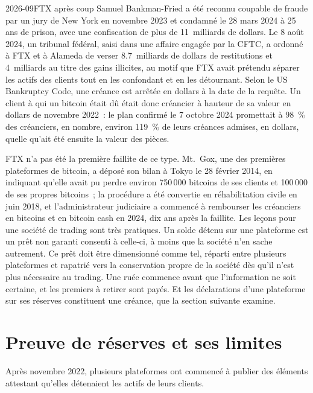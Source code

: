 \begin{dated}{2026-09}{FTX après coup}\label{dat:m3:centralised-exchanges:ftx}
Samuel Bankman-Fried a été reconnu coupable de fraude par un jury de New York en novembre 2023 et condamné le 28
mars 2024 à 25 ans de prison, avec une confiscation de plus de 11~milliards de dollars. Le 8 août 2024, un tribunal fédéral,
saisi dans une affaire engagée par la CFTC, a ordonné à FTX et à Alameda de
verser 8.7~milliards de dollars de restitutions et 4~milliards au titre des gains illicites, au motif que FTX avait
prétendu séparer les actifs des clients tout en les confondant et en les détournant. Selon le US Bankruptcy Code, une créance
est arrêtée en dollars à la date de la requête. Un client à qui un bitcoin était dû était donc créancier à hauteur de sa valeur en dollars de novembre
2022~: le plan confirmé le 7 octobre 2024 promettait à 98~\% des créanciers, en nombre, environ 119~\% de
leurs créances admises, en dollars, quelle qu'ait été ensuite la valeur des pièces.
\end{dated}

FTX n'a pas été la première faillite de ce type. Mt.~Gox, une des premières plateformes de bitcoin, a déposé son bilan à Tokyo
le 28 février 2014, en indiquant qu'elle avait pu perdre environ 750\,000 bitcoins de ses clients et 100\,000 de
ses propres bitcoins~; la procédure a été convertie en réhabilitation civile en juin 2018, et
l'administrateur judiciaire a commencé à rembourser les créanciers en bitcoins et en bitcoin cash en 2024, dix ans après la faillite. Les
leçons pour une société de trading sont très pratiques. Un solde détenu sur une plateforme est un prêt non garanti consenti à celle-ci, à moins que la société
n'en sache autrement. Ce prêt doit être dimensionné comme tel, réparti entre plusieurs plateformes et rapatrié
vers la conservation propre de la société dès qu'il n'est plus nécessaire au trading. Une ruée commence avant que l'information ne soit certaine, et les premiers
à retirer sont payés. Et les déclarations d'une plateforme sur ses réserves constituent une créance, que la section suivante
examine.

\section{Preuve de réserves et ses limites}

Après novembre 2022, plusieurs plateformes ont commencé à publier des éléments attestant qu'elles détenaient les actifs de leurs clients.

